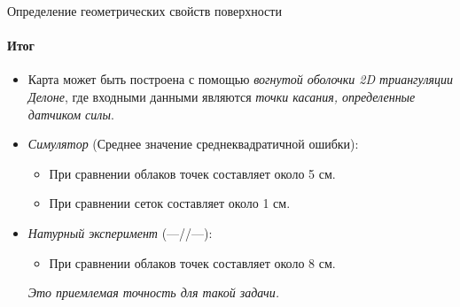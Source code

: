 \documentclass[aspectratio=169,xcolor=table]{beamer}
\begin{document}
\begin{frame}[t]{Определение геометрических свойств поверхности}
    \framesubtitle{Итог}
    \large
    \begin{itemize}
        \item Карта может быть построена с помощью \textit{вогнутой оболочки 2D триангуляции Делоне}, где входными данными являются \textit{точки касания, определенные датчиком силы}.
        \item \textit{Симулятор} (Среднее значение среднеквадратичной ошибки): \begin{itemize}
            \large
                  \item При сравнении облаков точек составляет около 5 см.
                  \item При сравнении сеток составляет около 1 см.
              \end{itemize}
        \item \textit{Натурный эксперимент} (---//---): \begin{itemize}
            \large
                  \item При сравнении облаков точек составляет около 8 см.
              \end{itemize}
              \textit{Это приемлемая точность для такой задачи.}
    \end{itemize}
\end{frame}
\end{document}
